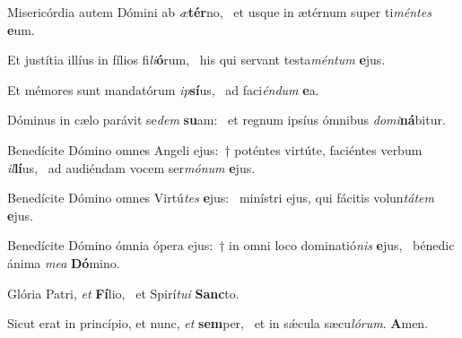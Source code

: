 \item Misericórdia autem Dómini ab \textit{æ}\textbf{tér}no,~\psstar{} et usque in ætérnum super ti\textit{méntes} \textbf{e}um.
\item Et justítia illíus in fílios fi\textit{li}\textbf{ó}rum,~\psstar{} his qui servant testa\textit{méntum} \textbf{e}jus.
\item Et mémores sunt mandatórum \textit{ip}\textbf{sí}us,~\psstar{} ad faci\textit{éndum} \textbf{e}a.
\item Dóminus in cælo parávit se\textit{dem} \textbf{su}am:~\psstar{} et regnum ipsíus ómnibus \textit{domi}\textbf{ná}bitur.
\item Benedícite Dómino omnes Angeli ejus:~† poténtes virtúte, faciéntes verbum \textit{il}\textbf{lí}us,~\psstar{} ad audiéndam vocem ser\textit{mónum} \textbf{e}jus.
\item Benedícite Dómino omnes Virtú\textit{tes} \textbf{e}jus:~\psstar{} minístri ejus, qui fácitis volun\textit{tátem} \textbf{e}jus.
\item Benedícite Dómino ómnia ópera ejus:~† in omni loco dominatió\textit{nis} \textbf{e}jus,~\psstar{} bénedic ánima \textit{mea} \textbf{Dó}mino.
\item Glória Patri, \textit{et} \textbf{Fí}lio,~\psstar{} et Spirí\textit{tui} \textbf{Sanc}to.
\item Sicut erat in princípio, et nunc, \textit{et} \textbf{sem}per,~\psstar{} et in sǽcula sæcu\textit{lórum}. \textbf{A}men.